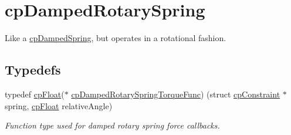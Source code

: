 \hypertarget{group__cp_damped_rotary_spring}{}\section{cp\+Damped\+Rotary\+Spring}
\label{group__cp_damped_rotary_spring}


Like a \hyperlink{structcp_damped_spring}{cp\+Damped\+Spring}, but operates in a rotational fashion.  


\subsection*{Typedefs}
\begin{DoxyCompactItemize}
\item 
\hypertarget{group__cp_damped_rotary_spring_ga072c236959020fab4f30087b5234040b}{}typedef \hyperlink{group__basic_types_gac1ed65573e035bf892505768c852d8d3}{cp\+Float}($\ast$ \hyperlink{group__cp_damped_rotary_spring_ga072c236959020fab4f30087b5234040b}{cp\+Damped\+Rotary\+Spring\+Torque\+Func}) (struct \hyperlink{structcp_constraint}{cp\+Constraint} $\ast$spring, \hyperlink{group__basic_types_gac1ed65573e035bf892505768c852d8d3}{cp\+Float} relative\+Angle)\label{group__cp_damped_rotary_spring_ga072c236959020fab4f30087b5234040b}

\begin{DoxyCompactList}\small\item\em Function type used for damped rotary spring force callbacks. \end{DoxyCompactList}\end{DoxyCompactItemize}
